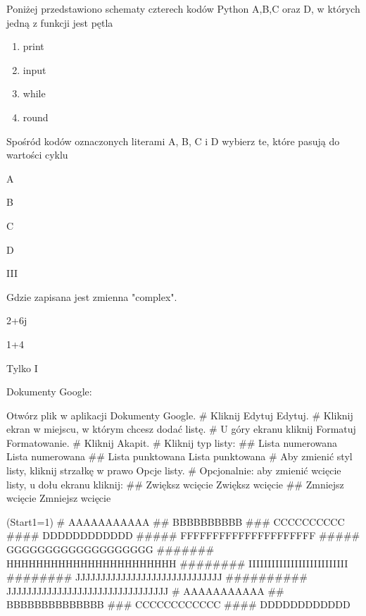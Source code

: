 \documentclass{article}
\begin{document}
	\begin{Pytania}
		\item Poniżej przedstawiono schematy czterech kodów Python A,B,C oraz D,  w których jedną z funkcji jest pętla
		\renewcommand{\labelenumi}{\Alph{enumi}}
		\begin{enumerate}
			\item print
			\item input
			\item while
			\item round
		\end{enumerate}
		
		Spośród kodów oznaczonych literami A, B, C i D wybierz te, które pasują do wartości cyklu
		\begin{Odpowiedz}
			\item A
			\item B
			\item C
			\item D
		\end{Odpowiedz}
		\begin{POdpowiedz}
			\item III  \newline
			\newline
		\end{POdpowiedz}
		\item Gdzie zapisana jest zmienna "complex".
		\begin{Odpowiedz}
			\item 2+6j
			\item 1+4
		\end{Odpowiedz}
		\begin{POdpowiedz}
			\item Tylko I
		\end{POdpowiedz}
	\end{Pytania}
	\noindent Dokumenty Google:
	\begin{easylist}\newline
		\newline
		Otwórz plik w aplikacji Dokumenty Google.
		# Kliknij Edytuj Edytuj.
		# Kliknij ekran w miejscu, w którym chcesz dodać listę.
		# U góry ekranu kliknij Formatuj Formatowanie.
		# Kliknij Akapit.
		# Kliknij typ listy:
		## Lista numerowana Lista numerowana
		## Lista punktowana Lista punktowana
		# Aby zmienić styl listy, kliknij strzałkę w prawo Opcje listy.
		# Opcjonalnie: aby zmienić wcięcie listy, u dołu ekranu kliknij:
		## Zwiększ wcięcie Zwiększ wcięcie
		## Zmniejsz wcięcie Zmniejsz wcięcie
	\end{easylist}
	\begin{easylist}
		\ListProperties(Start1=1)
		# AAAAAAAAAAA
		## BBBBBBBBBB
		### CCCCCCCCCC
		#### DDDDDDDDDDDD
		##### FFFFFFFFFFFFFFFFFFFFF
		##### GGGGGGGGGGGGGGGGGGG
		####### HHHHHHHHHHHHHHHHHHHHHHH
		######## IIIIIIIIIIIIIIIIIIIIIIIIII
		######## JJJJJJJJJJJJJJJJJJJJJJJJJJJJJ
		########## JJJJJJJJJJJJJJJJJJJJJJJJJJJJJJJJ
		# AAAAAAAAAAA
		## BBBBBBBBBBBBBB
		### CCCCCCCCCCCC
		#### DDDDDDDDDDDD
	\end{easylist}
\end{document}
